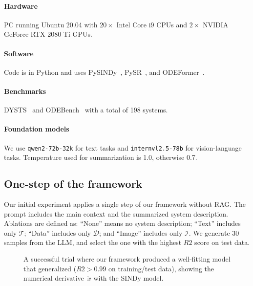 \documentclass{article}
\begin{document}
\paragraph{Hardware}

PC running Ubuntu 20.04 with $20\times$ Intel Core i9 CPUs and $2\times$ NVIDIA GeForce RTX 2080 Ti GPUs.

\paragraph{Software}

Code is in Python and uses
PySINDy~\cite{deSilva2020,Kaptanoglu2022}, 
PySR~\cite{Cranmer23}, and 
ODEFormer~\cite{ascoli2024odeformer}.

\paragraph{Benchmarks}

DYSTS~\cite{gilpin2021chaos} and ODEBench~\cite{ascoli2024odeformer} with a total of 198 systems.

\paragraph{Foundation models}

We use \texttt{qwen2-72b-32k} for text tasks and \texttt{internvl2.5-78b} for vision-language tasks.
Temperature used for summarization is 1.0, otherwise 0.7.

\subsection{One-step of the framework}
\label{sec:expr:one-step}

Our initial experiment applies a single step of our framework without RAG. 
The prompt includes the main context and the summarized system description.
Ablations are defined as:
``None'' means no system description; 
``Text'' includes only $\mathcal{T}$; 
``Data'' includes only $\mathcal{D}$; and 
``Image'' includes only $\mathcal{I}$.
We generate 30 samples from the LLM, and select the one with the highest $R2$ score on test data.

\begin{figure}
    \centering
    \hfill
    \caption{A successful trial where our framework produced a well-fitting model that generalized ($R2>0.99$ on training/test data), showing the numerical derivative~$\dot{x}$ with the SINDy model.}
    \label{fig:success-aizawa}
\end{figure}
\end{document}
